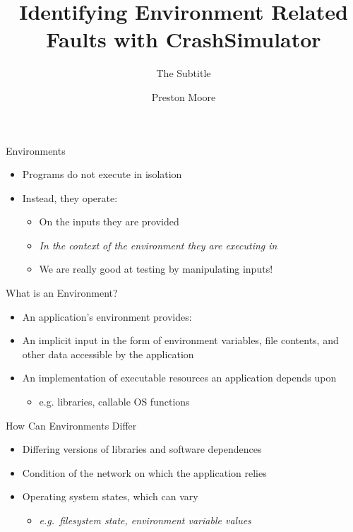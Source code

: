 \documentclass[pdf]{beamer}
\title{Identifying Environment Related Faults with CrashSimulator}
\subtitle{The Subtitle}
\author{Preston Moore}
\begin{document}
\begin{frame}
  \titlepage{}
\end{frame}


\begin{frame}{Environments}
  \begin{itemize}
  \item{Programs do not execute in isolation}
  \item{Instead, they operate:}
    \begin{itemize}
    \item{On the inputs they are provided}
    \item{\textit{In the context of the environment they are executing in}}
    \item{We are really good at testing by manipulating inputs!}
    \end{itemize}
  \end{itemize}
\end{frame}


\begin{frame}{What is an Environment?}
  \begin{itemize}
  \item{An application's environment provides:}
  \item{An implicit input in the form of environment variables, file
      contents, and other data accessible by the application}
  \item{An implementation of executable resources an application depends upon}
    \begin{itemize}
    \item{e.g. libraries, callable OS functions}
    \end{itemize}
\end{itemize}
\end{frame}


\begin{frame}{How Can Environments Differ}
  \begin{itemize}
  \item{Differing versions of libraries and software dependences}
  \item{Condition of the network on which the application relies}
  \item{Operating system states, which can vary}
    \begin{itemize}
    \item{\textit{e.g.\ filesystem state, environment variable values}}
    \end{itemize}
  \end{itemize}
\end{frame}
\end{document}
